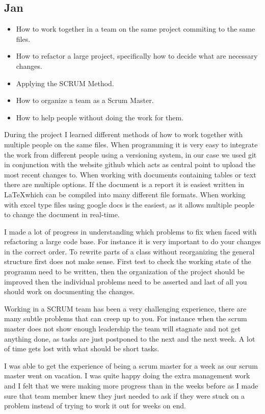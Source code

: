 \documentclass{article}
\begin{document}
\begin{enumerate}
\begin{itemize}
\subsection*{Jan}
\begin{itemize}
	\item How to work together in a team on the same project commiting to the same files.
	\item How to refactor a large project, specifically how to decide what are necessary changes.
	\item Applying the SCRUM Method.
	\item How to organize a team as a Scrum Master.
	\item How to help people without doing the work for them.
\end{itemize}

During the project I learned different methods of how to work together with multiple people on the same files. When programming it is very easy to integrate the work from different people using a versioning system, in our case we used git in conjunction with the website github which acts as central point to upload the most recent changes to. When working with documents containing tables or text there are multiple options. If the document is a report it is easiest written in \LaTeX which can be compiled into many different file formats. When working with excel type files using google docs is the easiest, as it allows multiple people to change the document in real-time.

I made a lot of progress in understanding which problems to fix when faced with refactoring a large code base. For instance it is very important to do your changes in the correct order. To rewrite parts of a class without reorganizing the general structure first does not make sense. First test to check the working state of the programm need to be written, then the organization of the project should be improved then the individual problems need to be asserted and last of all you should work on documenting the changes.

Working in a SCRUM team has been a very challenging experience, there are many subtle problems that can creep up to you. For instance when the scrum master does not show enough leadership the team will stagnate and not get anything done, as tasks are just postponed to the next and the next week. A lot of time gets lost with what should be short tasks.

I was able to get the experience of being a scrum master for a week as our scrum master went on vacation. I was quite happy doing the extra management work and I felt that we were making more progress than in the weeks before as I made sure that team member knew they just needed to ask if they were stuck on a problem instead of trying to work it out for weeks on end.


\end{itemize}
\end{enumerate}
\end{document}
